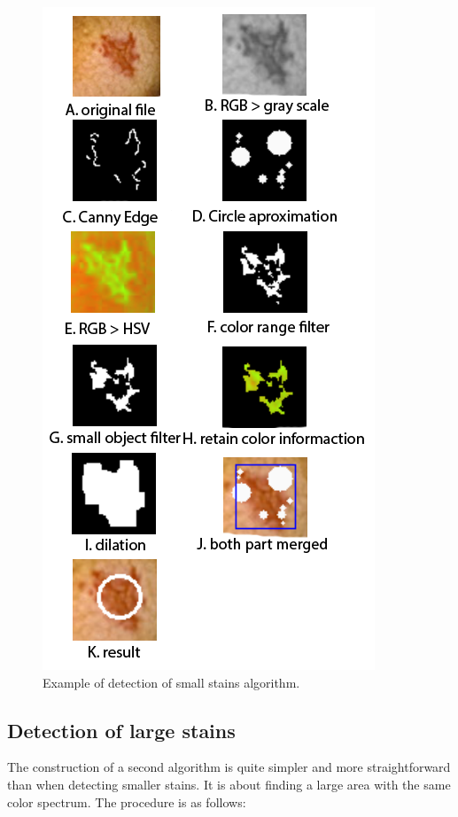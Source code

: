 \documentclass[twoside]{article}
\begin{document}
\begin{multicols}{2}
\begin{figure}[H]
	\includegraphics[scale=0.5]{alg1_clanek}
	\centering
	\caption{Example of detection of small stains algorithm. \label{fig:alg_1}}
\end{figure} 

\subsection{Detection of large stains}
The construction of a second algorithm is quite simpler and more straightforward than when detecting smaller stains. It is about finding a large area with the same color spectrum. The procedure is as follows:


\end{multicols}
\end{document}
